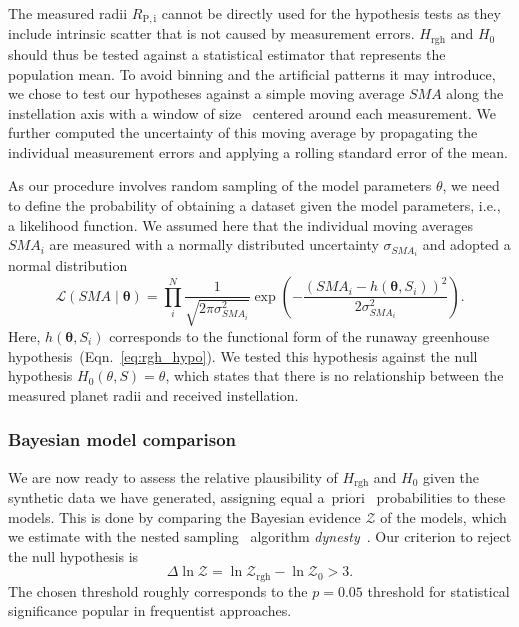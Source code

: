 \documentclass[modern]{aastex631}
\begin{document}
\begin{note}
The measured radii $R_\mathrm{P, i}$ cannot be directly used for the hypothesis tests as they include intrinsic scatter that is not caused by measurement errors.
$H_{\mathrm{rgh}}$ and $H_0$ should thus be tested against a statistical estimator that represents the population mean.
To avoid binning and the artificial patterns it may introduce, we chose to test our hypotheses against a simple moving average $SMA$ along the instellation axis with a window of size \windowsize\ centered around each measurement.
We further computed the uncertainty of this moving average by propagating the individual measurement errors and applying a rolling standard error of the mean. 

As our procedure involves random sampling of the model parameters $\theta$, we need to define the probability of obtaining a dataset given the model parameters, i.e., a likelihood function.
We assumed here that the individual moving averages $SMA_i$ are measured with a normally distributed uncertainty $\sigma_{SMA_i}$ and adopted a normal distribution
\begin{equation}
    \mathcal{L}(SMA \mid \boldsymbol{\theta})=\prod_{i}^{N} \frac{1}{\sqrt{2 \pi \sigma_{SMA_i}^{2}}} \exp \left(-\frac{\left(SMA_i - h\left(\boldsymbol{\theta}, S_i\right)\right)^{2}}{2 \sigma_{SMA_i}^{2}}\right).
\end{equation}
Here, $h\left(\boldsymbol{\theta}, S_i\right)$ corresponds to the functional form of the runaway greenhouse hypothesis~(Eqn.~\ref{eq:rgh_hypo}).
We tested this hypothesis against the null hypothesis $H_0 (\theta, S) = \theta$, which states that there is no relationship between the measured planet radii and received instellation.
\end{note}



\subsubsection{Bayesian model comparison}
We are now ready to assess the relative plausibility of $H_{\mathrm{rgh}}$ and $H_0$ given the synthetic data we have generated, assigning equal a~priori~ probabilities to these models.
This is done by comparing the Bayesian evidence $\mathcal{Z}$ of the models, which we estimate with the nested sampling~\citep{Skilling2004} algorithm \emph{dynesty}~\citep{Speagle2020}.
Our criterion to reject the null hypothesis is
\begin{equation}
\Delta \ln \mathcal{Z}  = \ln \mathcal{Z}_\mathrm{rgh} - \ln \mathcal{Z}_0  > 3.
\end{equation}
The chosen threshold roughly corresponds to the $p = 0.05$ threshold for statistical significance popular in frequentist approaches.
\end{document}
